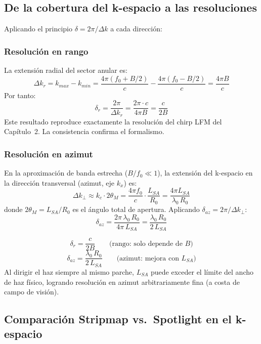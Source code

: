 \documentclass[12pt,a4paper,oneside]{book}
\newcommand{\result}[2]{%
  \begin{tcolorbox}[enhanced, breakable,
    colback=yellow!8, colframe=orange!70!black,
    fonttitle=\bfseries,
    title={\protect#1},
    attach boxed title to top left={yshift=-2mm, xshift=5mm},
    boxed title style={colback=orange!70!black}]
    #2
  \end{tcolorbox}}
\begin{document}
\subsection{De la cobertura del k-espacio a las resoluciones}

Aplicando el principio $\delta=2\pi/\Delta k$ a cada dirección:

\subsubsection{Resolución en rango}

La extensión radial del sector anular es:
\[
\Delta k_r = k_{max} - k_{min} = \frac{4\pi(f_0+B/2)}{c} - \frac{4\pi(f_0-B/2)}{c} = \frac{4\pi B}{c}
\]
Por tanto:
\[
\delta_r = \frac{2\pi}{\Delta k_r} = \frac{2\pi\cdot c}{4\pi B} = \frac{c}{2B}
\]
Este resultado reproduce exactamente la resolución del chirp LFM del Capítulo~2. La consistencia confirma el formalismo.

\subsubsection{Resolución en azimut}

En la aproximación de banda estrecha ($B/f_0\ll 1$), la extensión del k-espacio en la dirección transversal (azimut, eje $k_x$) es:
\[
\Delta k_\perp \approx k_c \cdot 2\theta_M
  = \frac{4\pi f_0}{c}\cdot\frac{L_{SA}}{R_0}
  = \frac{4\pi L_{SA}}{\lambda_0\,R_0}
\]
donde $2\theta_M = L_{SA}/R_0$ es el ángulo total de apertura. Aplicando $\delta_{az}=2\pi/\Delta k_\perp$:
\[
\delta_{az} = \frac{2\pi\,\lambda_0\,R_0}{4\pi\,L_{SA}} = \frac{\lambda_0\,R_0}{2\,L_{SA}}
\]

\result{Resoluciones SAR Spotlight}{
\[
\boxed{\delta_r = \frac{c}{2B}} \qquad\text{(rango: solo depende de $B$)}
\]
\[
\boxed{\delta_{az} = \frac{\lambda_0\,R_0}{2\,L_{SA}}} \qquad\text{(azimut: mejora con $L_{SA}$)}
\]
Al dirigir el haz siempre al mismo parche, $L_{SA}$ puede exceder el límite del ancho de haz físico, logrando resolución en azimut arbitrariamente fina (a costa de campo de visión).
}

\subsection{Comparación Stripmap vs.\ Spotlight en el k-espacio}
\end{document}
